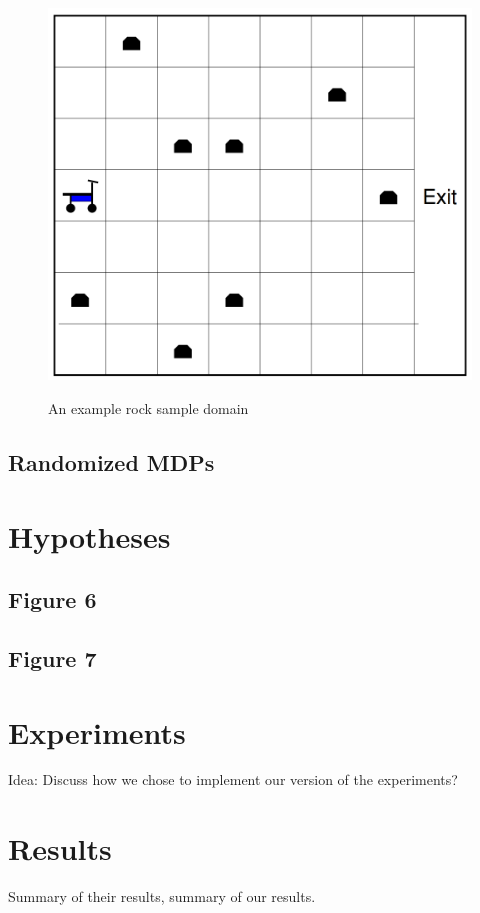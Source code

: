 \documentclass[11pt]{article} %
\begin{document}
\begin{figure}[h]
\label{fig: RockSample}
\centering
\includegraphics[page=1,width=.42\textwidth]{rock_sample_domain.png} \\
\caption{An example rock sample domain}
\end{figure}



\subsection{Randomized MDPs}

\section{Hypotheses}

\subsection{Figure 6}

\subsection{Figure 7}


\section{Experiments}

Idea: Discuss how we chose to implement our version of the experiments?



\section{Results}

Summary of their results, summary of our results.
\end{document}
